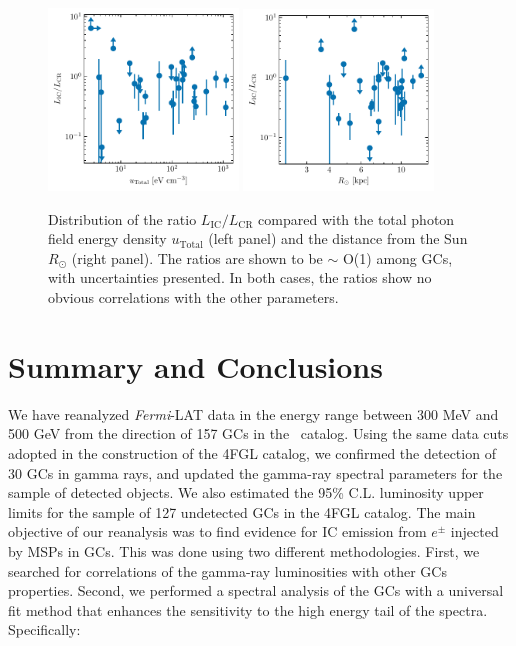 \documentclass[doublespace,nopageskip]{VTthesis} %
\begin{document}
\begin{figure}
    \centering
    \includegraphics[width=0.45\textwidth]{Figures/Globular/ratio_urad.pdf}
    \includegraphics[width=0.45\textwidth]{Figures/Globular/ratio_Rsun.pdf}
    \caption{Distribution of the ratio $L_\mathrm{IC}/L_\mathrm{CR}$ compared with the total photon field energy density $u_\mathrm{Total}$ (left panel) and the distance from the Sun $R_\odot$ (right panel). The ratios are shown to be $\sim$ O(1) among GCs, with uncertainties presented. In both cases, the ratios show no obvious correlations with the other parameters.}
    \label{fig:fe}
\end{figure}

\section{Summary and Conclusions}\label{sec:conclusion}

We have reanalyzed \textit{Fermi}-LAT data in the energy range between 300 MeV and 500 GeV from the direction of 157 GCs in the~\citet{1996AJ....112.1487H} catalog. Using the same data cuts adopted in the construction of the 4FGL catalog, we confirmed the detection of 30 GCs in gamma rays, and updated the gamma-ray spectral parameters for the sample of detected objects. We also estimated the 95\% C.L. luminosity upper limits for the sample of 127 undetected GCs in the 4FGL catalog. The main objective of our reanalysis was to find evidence for IC emission from $e^{\pm}$ injected by MSPs in GCs. This was done using two different methodologies. First, we searched for correlations of the gamma-ray luminosities with other GCs properties. Second, we performed a spectral analysis of the GCs with a universal fit method that enhances the sensitivity to the high energy tail of the spectra. Specifically:
\end{document}

